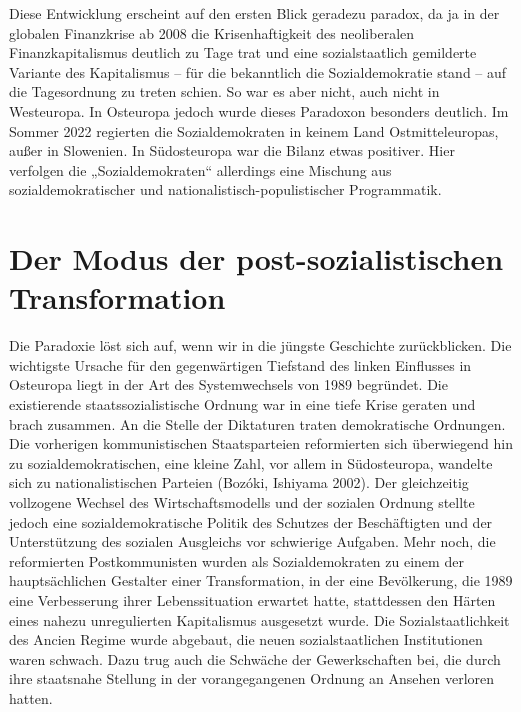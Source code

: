 \begin{multicols*}{2}

    \noindent Diese Entwicklung erscheint auf den ersten Blick geradezu paradox, da ja in der globalen Finanzkrise ab 2008 die Krisenhaftigkeit des neoliberalen Finanzkapitalismus deutlich zu Tage trat und eine sozialstaatlich gemilderte Variante des Kapitalismus – für die bekanntlich die Sozialdemokratie stand – auf die Tagesordnung zu treten schien. So war es aber nicht, auch nicht in Westeuropa. In Osteuropa jedoch wurde dieses Paradoxon besonders deutlich. Im Sommer 2022 regierten die Sozialdemokraten in keinem Land Ostmitteleuropas, außer in Slowenien. In Südosteuropa war die Bilanz etwas positiver. Hier verfolgen die „Sozialdemokraten“ allerdings eine Mischung aus sozialdemokratischer und nationalistisch-populistischer Programmatik.

    \section{Der Modus der post-sozialistischen Transformation}

    \noindent Die Paradoxie löst sich auf, wenn wir in die jüngste Geschichte zurückblicken. Die wichtigste Ursache für den gegenwärtigen Tiefstand des linken Einflusses in Osteuropa liegt in der Art des Systemwechsels von 1989 begründet. Die existierende staatssozialistische Ordnung war in eine tiefe Krise geraten und brach zusammen. An die Stelle der Diktaturen traten demokratische Ordnungen. Die vorherigen kommunistischen Staatsparteien reformierten sich überwiegend hin zu sozialdemokratischen, eine kleine Zahl, vor allem in Südosteuropa, wandelte sich zu nationalistischen Parteien (Bozóki, Ishiyama 2002). Der gleichzeitig vollzogene Wechsel des Wirtschaftsmodells und der sozialen Ordnung stellte jedoch eine sozialdemokratische Politik des Schutzes der Beschäftigten und der Unterstützung des sozialen Ausgleichs vor schwierige Aufgaben. Mehr noch, die reformierten Postkommunisten wurden als Sozialdemokraten zu einem der hauptsächlichen Gestalter einer Transformation, in der eine Bevölkerung, die 1989 eine Verbesserung ihrer Lebenssituation erwartet hatte, stattdessen den Härten eines nahezu unregulierten Kapitalismus  ausgesetzt wurde. Die Sozialstaatlichkeit des Ancien Regime wurde abgebaut, die neuen sozialstaatlichen Institutionen waren schwach. Dazu trug auch die Schwäche der Gewerkschaften bei, die durch ihre staatsnahe Stellung in der vorangegangenen Ordnung an Ansehen verloren hatten.


\end{multicols*}
